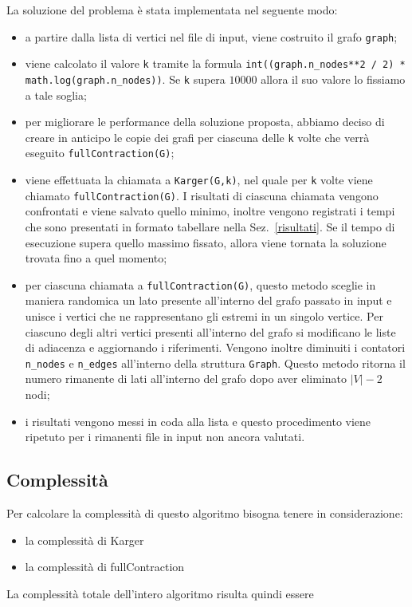 	La soluzione del problema è stata implementata nel seguente modo:
	\begin{itemize}
		\item a partire dalla lista di vertici nel file di input, viene costruito il grafo \texttt{graph};
		\item viene calcolato il valore \texttt{k} tramite la formula \texttt{int((graph.n\_nodes**2 / 2) * \\
			math.log(graph.n\_nodes))}. Se \texttt{k} supera $10000$ allora il suo valore lo fissiamo a tale soglia;
		\item per migliorare le performance della soluzione proposta, abbiamo deciso di creare in anticipo le copie dei grafi per ciascuna delle \texttt{k} volte che verrà eseguito \texttt{fullContraction(G)};
		\item viene effettuata la chiamata a \texttt{Karger(G,k)}, nel quale per \texttt{k} volte viene chiamato \texttt{fullContraction(G)}. I risultati di ciascuna chiamata vengono confrontati e viene salvato quello minimo, inoltre vengono registrati i tempi che sono presentati in formato tabellare nella Sez.~\ref{risultati}. Se il tempo di esecuzione supera quello massimo fissato, allora viene tornata la soluzione trovata fino a quel momento;
		\item per ciascuna chiamata a \texttt{fullContraction(G)}, questo metodo sceglie in maniera randomica un lato presente all'interno del grafo passato in input e unisce i vertici che ne rappresentano gli estremi in un singolo vertice. Per ciascuno degli altri vertici presenti all'interno del grafo si modificano le liste di adiacenza e aggiornando i riferimenti. Vengono inoltre diminuiti i contatori \texttt{n\_nodes} e \texttt{n\_edges} all'interno della struttura \texttt{Graph}. Questo metodo ritorna il numero rimanente di lati all'interno del grafo dopo aver eliminato $|V|-2$ nodi;
		\item i risultati vengono messi in coda alla lista e questo procedimento viene ripetuto per i rimanenti file in input non ancora valutati.
	\end{itemize}
		
\subsection{Complessità}

	Per calcolare la complessità di questo algoritmo bisogna tenere in considerazione:
	\begin{itemize}
		\item la complessità di Karger
		\item la complessità di fullContraction
	\end{itemize}
	La complessità totale dell'intero algoritmo risulta quindi essere

\pagebreak